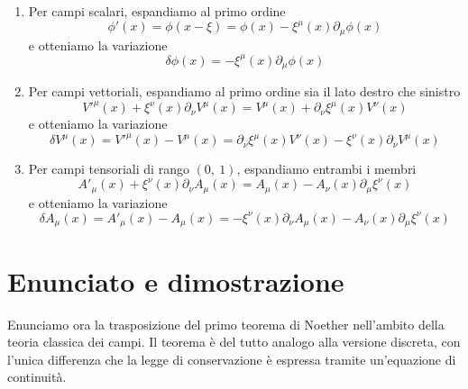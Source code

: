     \begin{enumerate}
        \item Per campi scalari, espandiamo al primo ordine
    \begin{equation*}
        \phi'(x) = \phi(x - \xi) = \phi(x) - \xi^\mu(x) \partial_\mu \phi(x)
    \end{equation*}  
        e otteniamo la variazione
    \begin{equation}\label{variazionescalare}
        \delta \phi(x) = - \xi^\mu(x) \partial_\mu \phi(x)
    \end{equation} 
        \item Per campi vettoriali, espandiamo al primo ordine sia il lato destro che sinistro
    \begin{equation*}
        V'^\mu(x) + \xi^\nu(x) \partial_\nu V^\mu (x) = V^\mu(x) + \partial_\nu \xi^\mu(x) V^\nu(x)
    \end{equation*}
        e otteniamo la variazione
    \begin{equation*}
        \delta V^\mu(x) = V'^\mu(x) - V^\mu(x) = \partial_\nu \xi^\mu(x) V^\nu(x) - \xi^\nu (x)\partial_\nu V^\mu(x)
    \end{equation*}
        \item Per campi tensoriali di rango $(0,~1)$, espandiamo entrambi i membri 
    \begin{equation*}
        A'_\mu(x) + \xi^\nu(x) \partial_\nu A_\mu (x) = A_\mu(x) - A_\nu(x) \partial_\mu \xi^\nu(x)
    \end{equation*}
        e otteniamo la variazione
    \begin{equation}\label{variazione10}
        \delta A_\mu(x) = A'_\mu(x) - A_\mu(x) = - \xi^\nu(x) \partial_\nu A_\mu (x) - A_\nu(x) \partial_\mu \xi^\nu(x)
    \end{equation}
    \end{enumerate}

\section{Enunciato e dimostrazione}
    Enunciamo ora la trasposizione del primo teorema di Noether nell'ambito della teoria classica dei campi. Il teorema è del tutto analogo alla versione discreta, con l'unica differenza che la legge di conservazione è espressa tramite un'equazione di continuità.

